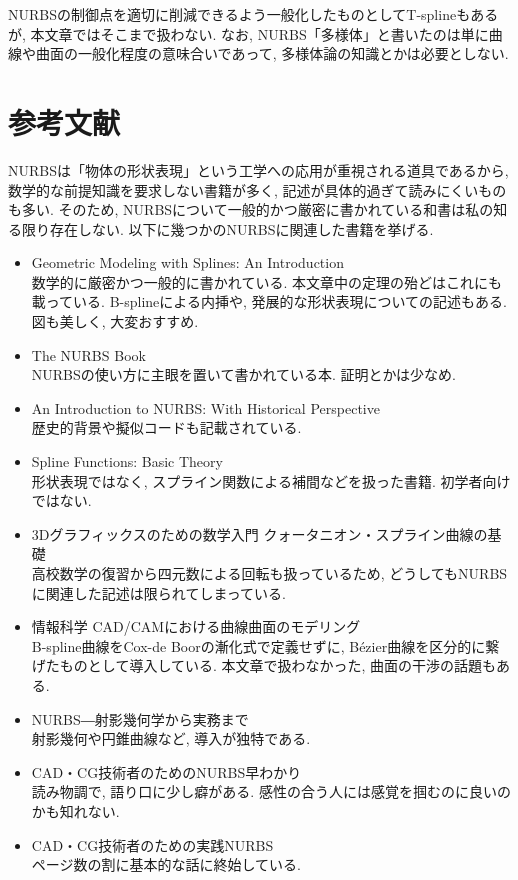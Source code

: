 \documentclass{jsarticle}
\theoremstyle{definition}%
\begin{document}


NURBSの制御点を適切に削減できるよう一般化したものとしてT-splineもあるが, 本文章ではそこまで扱わない.
なお, NURBS「多様体」と書いたのは単に曲線や曲面の一般化程度の意味合いであって, 多様体論の知識とかは必要としない.

\section*{参考文献}
NURBSは「物体の形状表現」という工学への応用が重視される道具であるから, 数学的な前提知識を要求しない書籍が多く, 記述が具体的過ぎて読みにくいものも多い.
そのため, NURBSについて一般的かつ厳密に書かれている和書は私の知る限り存在しない.
以下に幾つかのNURBSに関連した書籍を挙げる.
\begin{itemize}
    \item Geometric Modeling with Splines: An Introduction \\
    数学的に厳密かつ一般的に書かれている.
    本文章中の定理の殆どはこれにも載っている.
    B-splineによる内挿や, 発展的な形状表現についての記述もある.
    図も美しく, 大変おすすめ.
    \item The NURBS Book \\
    NURBSの使い方に主眼を置いて書かれている本. 証明とかは少なめ.
    \item An Introduction to NURBS: With Historical Perspective \\
    歴史的背景や擬似コードも記載されている.
    \item Spline Functions: Basic Theory \\
    形状表現ではなく, スプライン関数による補間などを扱った書籍.
    初学者向けではない.
    \item 3Dグラフィックスのための数学入門 クォータニオン・スプライン曲線の基礎 \\
    高校数学の復習から四元数による回転も扱っているため, どうしてもNURBSに関連した記述は限られてしまっている.
    \item 情報科学 CAD/CAMにおける曲線曲面のモデリング \\
    B-spline曲線をCox-de Boorの漸化式で定義せずに, B\'{e}zier曲線を区分的に繋げたものとして導入している.
    本文章で扱わなかった, 曲面の干渉の話題もある.
    \item NURBS―射影幾何学から実務まで \\
    射影幾何や円錐曲線など, 導入が独特である.
    \item CAD・CG技術者のためのNURBS早わかり \\
    読み物調で, 語り口に少し癖がある.
    感性の合う人には感覚を掴むのに良いのかも知れない.
    \item CAD・CG技術者のための実践NURBS \\
    ページ数の割に基本的な話に終始している.
\end{itemize}
\end{document}

